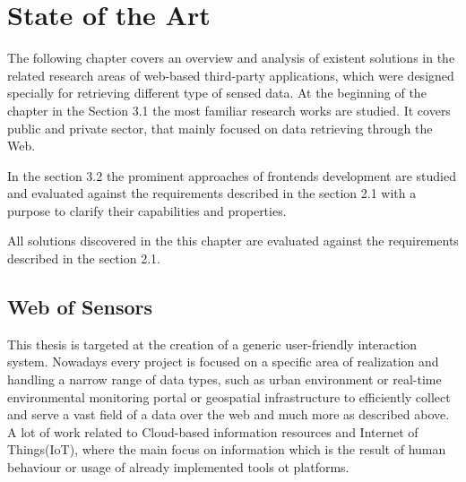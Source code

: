 \chapter{State of the Art}
The following chapter covers an overview and analysis of existent solutions in the related research areas of web-based third-party applications, which were designed specially for retrieving different type of sensed data. At the beginning of the chapter in the Section 3.1 the most familiar research works are studied. It covers public and private sector, that mainly focused on data retrieving through the Web.

In the section 3.2 the prominent approaches of frontends development are studied and evaluated against the requirements described in the section 2.1 with a purpose to clarify their capabilities and properties.  

All solutions discovered in the this chapter are evaluated against the requirements described in the section 2.1.

\section{Web of Sensors}
 This thesis is targeted at the creation of a generic user-friendly interaction system. Nowadays every project is focused on a specific area of realization and handling a narrow range of data types, such as urban environment\cite{song2010real} or real-time environmental monitoring portal or geospatial infrastructure to efficiently collect and serve a vast field of a data over the web\cite{6588063} and much more as described above. A lot of work related to Cloud-based information resources and Internet of Things(IoT), where the main focus on information which is the result of human behaviour or usage of already implemented tools ot platforms.  

